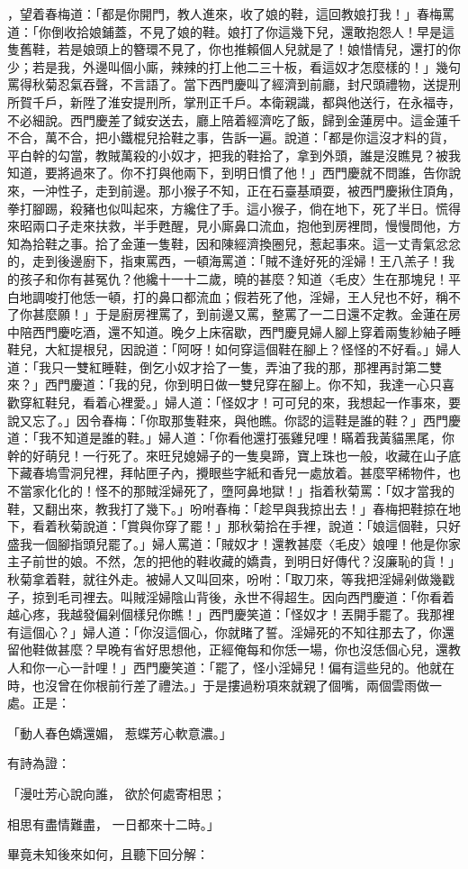 ，望着春梅道：「都是你開門，教人進來，收了娘的鞋，這回教娘打我！」春梅罵道：「你倒收拾娘鋪蓋，不見了娘的鞋。娘打了你這幾下兒，還敢抱怨人！早是這隻舊鞋，若是娘頭上的簪環不見了，你也推賴個人兒就是了！娘惜情兒，還打的你少；若是我，外邊叫個小廝，辣辣的打上他二三十板，看這奴才怎麼樣的！」幾句罵得秋菊忍氣吞聲，不言語了。當下西門慶叫了經濟到前廳，封尺頭禮物，送提刑所賀千戶，新陞了淮安提刑所，掌刑正千戶。本衛親識，都與他送行，在永福寺，不必細說。西門慶差了鉞安送去，廳上陪着經濟吃了飯，歸到金蓮房中。這金蓮千不合，萬不合，把小鐵棍兒拾鞋之事，告訴一遍。說道：「都是你這沒才料的貨，平白幹的勾當，教賊萬殺的小奴才，把我的鞋拾了，拿到外頭，誰是沒瞧見？被我知道，要將過來了。你不打與他兩下，到明日慣了他！」西門慶就不問誰，告你說來，一沖性子，走到前邊。那小猴子不知，正在石臺基頑耍，被西門慶揪住頂角，拳打腳踢，殺豬也似叫起來，方纔住了手。這小猴子，倘在地下，死了半日。慌得來昭兩口子走來扶救，半手甦醒，見小廝鼻口流血，抱他到房裡問，慢慢問他，方知為拾鞋之事。拾了金蓮一隻鞋，因和陳經濟換圈兒，惹起事來。這一丈青氣忿忿的，走到後邊廚下，指東罵西，一頓海罵道：「賊不逢好死的淫婦！王八羔子！我的孩子和你有甚冤仇？他纔十一十二歲，曉的甚麼？知道〈毛皮〉生在那塊兒！平白地調唆打他恁一頓，打的鼻口都流血；假若死了他，淫婦，王人兒也不好，稱不了你甚麼願！」于是廚房裡罵了，到前邊又罵，整罵了一二日還不定教。金蓮在房中陪西門慶吃酒，還不知道。晚夕上床宿歇，西門慶見婦人腳上穿着兩隻紗紬子睡鞋兒，大紅提根兒，因說道：「阿呀！如何穿這個鞋在腳上？怪怪的不好看。」婦人道：「我只一雙紅睡鞋，倒乞小奴才拾了一隻，弄油了我的那，那裡再討第二雙來？」西門慶道：「我的兒，你到明日做一雙兒穿在腳上。你不知，我達一心只喜歡穿紅鞋兒，看着心裡愛。」婦人道：「怪奴才！可可兒的來，我想起一作事來，要說又忘了。」因令春梅：「你取那隻鞋來，與他瞧。你認的這鞋是誰的鞋？」西門慶道：「我不知道是誰的鞋。」婦人道：「你看他還打張雞兒哩！瞞着我黃貓黑尾，你幹的好萌兒！一行死了。來旺兒媳婦子的一隻臭蹄，寶上珠也一般，收藏在山子底下藏春塢雪洞兒裡，拜帖匣子內，攪眼些字紙和香兒一處放着。甚麼罕稀物件，也不當家化化的！怪不的那賊淫婦死了，墮阿鼻地獄！」指着秋菊罵：「奴才當我的鞋，又翻出來，教我打了幾下。」吩咐春梅：「趁早與我掠出去！」春梅把鞋掠在地下，看着秋菊說道：「賞與你穿了罷！」那秋菊拾在手裡，說道：「娘這個鞋，只好盛我一個腳指頭兒罷了。」婦人罵道：「賊奴才！還教甚麼〈毛皮〉娘哩！他是你家主子前世的娘。不然，怎的把他的鞋收藏的嬌貴，到明日好傳代？沒廉恥的貨！」秋菊拿着鞋，就往外走。被婦人又叫回來，吩咐：「取刀來，等我把淫婦剁做幾戳子，掠到毛司裡去。叫賊淫婦陰山背後，永世不得超生。因向西門慶道：「你看着越心疼，我越發偏剁個樣兒你瞧！」西門慶笑道：「怪奴才！丟開手罷了。我那裡有這個心？」婦人道：「你沒這個心，你就睹了誓。淫婦死的不知往那去了，你還留他鞋做甚麼？早晚有省好思想他，正經俺每和你恁一場，你也沒恁個心兒，還教人和你一心一計哩！」西門慶笑道：「罷了，怪小淫婦兒！偏有這些兒的。他就在時，也沒曾在你根前行差了禮法。」于是摟過粉項來就親了個嘴，兩個雲雨做一處。正是：

「動人春色嬌還媚，  惹蝶芳心軟意濃。」

有詩為證：

「漫吐芳心說向誰，  欲於何處寄相思；

相思有盡情難盡，  一日都來十二時。」

畢竟未知後來如何，且聽下回分解：


